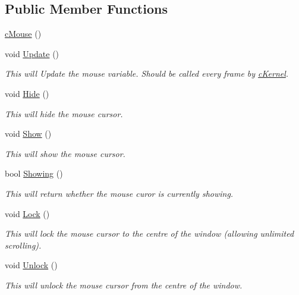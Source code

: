 \subsection*{Public Member Functions}
\begin{DoxyCompactItemize}
\item 
\hyperlink{classc_mouse_adcae7521aeba45172ebb18ab6e064297}{cMouse} ()
\item 
void \hyperlink{classc_mouse_a558d192a5c2df1352d1b8de7275a9359}{Update} ()
\begin{DoxyCompactList}\small\item\em This will Update the mouse variable. Should be called every frame by \hyperlink{classc_kernel}{cKernel}. \item\end{DoxyCompactList}\item 
void \hyperlink{classc_mouse_a65b10c846c3e0ac6d77f398095c66164}{Hide} ()
\begin{DoxyCompactList}\small\item\em This will hide the mouse cursor. \item\end{DoxyCompactList}\item 
void \hyperlink{classc_mouse_a54300b8fe1f8c5c0ec88e7ae26eff0e0}{Show} ()
\begin{DoxyCompactList}\small\item\em This will show the mouse cursor. \item\end{DoxyCompactList}\item 
bool \hyperlink{classc_mouse_a2653fbbb900967fda6eccf933019ab8d}{Showing} ()
\begin{DoxyCompactList}\small\item\em This will return whether the mouse curor is currently showing. \item\end{DoxyCompactList}\item 
void \hyperlink{classc_mouse_abef74e9066d916ec62daf4a440dbbe58}{Lock} ()
\begin{DoxyCompactList}\small\item\em This will lock the mouse cursor to the centre of the window (allowing unlimited scrolling). \item\end{DoxyCompactList}\item 
void \hyperlink{classc_mouse_a869bb420067947a30b57ad649e3f1f14}{Unlock} ()
\begin{DoxyCompactList}\small\item\em This will unlock the mouse cursor from the centre of the window. \item\end{DoxyCompactList}\end{DoxyCompactItemize}
